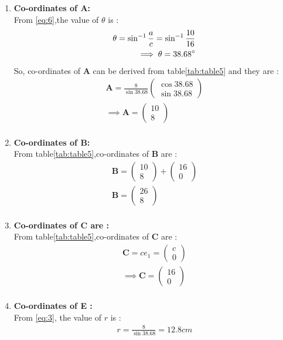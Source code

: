 \documentclass{article}
\newcommand{\myvec}[1]{\ensuremath{\begin{pmatrix}#1\end{pmatrix}}}
\let\vec\mathbf
\begin{document}
\begin{enumerate}
	\item \textbf{Co-ordinates of A:}\\
		From \ref{eq:6},the value of $\theta$ is :\\
		\begin{align}
			\theta = \sin^{-1}\frac{a}{c} = \sin^{-1}\frac{10}{16} \\
			\implies \theta = 38.68\degree\\
		\end{align}
		So, co-ordinates of $\vec{A}$ can be derived from table\ref{tab:table5} and they are :\\
		\begin{align}
			\vec{A} = \frac{8}{\sin{38.68}}\myvec{\cos{38.68}\\\sin{38.68}}\\
			\implies \vec{A} = \myvec{10\\8}\\
			\end{align}
	\item \textbf{Co-ordinates of B:}\\
		From table\ref{tab:table5},co-ordinates of $\vec{B}$ are :\\
		\begin{align}
			\vec{B} = \myvec{10\\8} + \myvec{16\\0}\\
			\vec{B} = \myvec{26\\8}\\
		\end{align}
	\item \textbf{Co-ordinates of C are :}\\
		From table\ref{tab:table5},co-ordinates of $\vec{C}$ are :\\
		\begin{align}
			\vec{C} = ce_1 = \myvec{c\\0}\\
			\implies \vec{C} = \myvec{16\\0}\\
		\end{align}
	\item \textbf{Co-ordinates of E :}\\
		From \ref{eq:3}, the value of $r$ is :\\
		\begin{align}
			r = \frac{8}{\sin{38.68}} = 12.8cm\\
			\label{eq:7}
		\end{align}

\end{enumerate}
\end{document}
